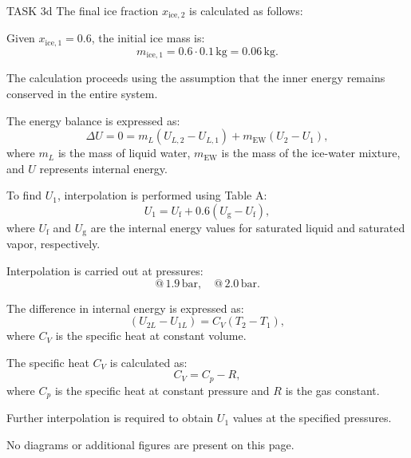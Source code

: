 TASK 3d  
The final ice fraction \( x_{\text{ice},2} \) is calculated as follows:  

Given \( x_{\text{ice},1} = 0.6 \), the initial ice mass is:  
\[
m_{\text{ice},1} = 0.6 \cdot 0.1 \, \text{kg} = 0.06 \, \text{kg}.
\]  

The calculation proceeds using the assumption that the inner energy remains conserved in the entire system.  

The energy balance is expressed as:  
\[
\Delta U = 0 = m_L (U_{L,2} - U_{L,1}) + m_{\text{EW}} (U_{2} - U_{1}),
\]  
where \( m_L \) is the mass of liquid water, \( m_{\text{EW}} \) is the mass of the ice-water mixture, and \( U \) represents internal energy.  

To find \( U_1 \), interpolation is performed using Table A:  
\[
U_1 = U_{\text{f}} + 0.6 (U_{\text{g}} - U_{\text{f}}),
\]  
where \( U_{\text{f}} \) and \( U_{\text{g}} \) are the internal energy values for saturated liquid and saturated vapor, respectively.  

Interpolation is carried out at pressures:  
\[
@ \, 1.9 \, \text{bar}, \quad @ \, 2.0 \, \text{bar}.
\]  

The difference in internal energy is expressed as:  
\[
(U_{2L} - U_{1L}) = C_V (T_2 - T_1),
\]  
where \( C_V \) is the specific heat at constant volume.  

The specific heat \( C_V \) is calculated as:  
\[
C_V = C_p - R,
\]  
where \( C_p \) is the specific heat at constant pressure and \( R \) is the gas constant.  

Further interpolation is required to obtain \( U_1 \) values at the specified pressures.  

No diagrams or additional figures are present on this page.